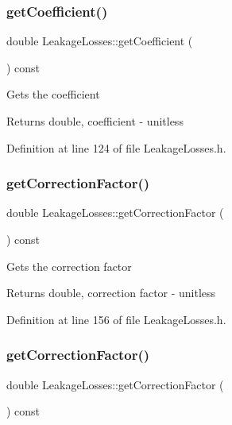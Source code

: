 \subsubsection{\texorpdfstring{get\+Coefficient()}{getCoefficient()}\hspace{0.1cm}{\footnotesize\ttfamily [3/3]}}
{\footnotesize\ttfamily double Leakage\+Losses\+::get\+Coefficient (\begin{DoxyParamCaption}{ }\end{DoxyParamCaption}) const\hspace{0.3cm}{\ttfamily [inline]}}

Gets the coefficient \begin{DoxyReturn}{Returns}
double, coefficient -\/ unitless 
\end{DoxyReturn}


Definition at line 124 of file Leakage\+Losses.\+h.

\mbox{\label{class_leakage_losses_ad4f289a7490cd3fd4dfc4099fc4ad562}} 
\subsubsection{\texorpdfstring{get\+Correction\+Factor()}{getCorrectionFactor()}\hspace{0.1cm}{\footnotesize\ttfamily [1/3]}}
{\footnotesize\ttfamily double Leakage\+Losses\+::get\+Correction\+Factor (\begin{DoxyParamCaption}{ }\end{DoxyParamCaption}) const\hspace{0.3cm}{\ttfamily [inline]}}

Gets the correction factor \begin{DoxyReturn}{Returns}
double, correction factor -\/ unitless 
\end{DoxyReturn}


Definition at line 156 of file Leakage\+Losses.\+h.

\mbox{\label{class_leakage_losses_ad4f289a7490cd3fd4dfc4099fc4ad562}} 
\subsubsection{\texorpdfstring{get\+Correction\+Factor()}{getCorrectionFactor()}\hspace{0.1cm}{\footnotesize\ttfamily [2/3]}}
{\footnotesize\ttfamily double Leakage\+Losses\+::get\+Correction\+Factor (\begin{DoxyParamCaption}{ }\end{DoxyParamCaption}) const\hspace{0.3cm}{\ttfamily [inline]}}

